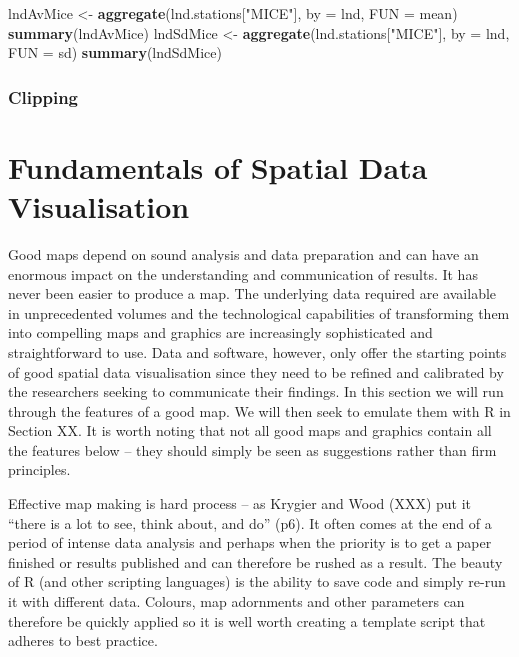 \documentclass[]{article}
\newenvironment{Shaded}{}{}
\newcommand{\KeywordTok}[1]{\textcolor[rgb]{0.00,0.44,0.13}{\textbf{{#1}}}}
\newcommand{\DataTypeTok}[1]{\textcolor[rgb]{0.56,0.13,0.00}{{#1}}}
\newcommand{\StringTok}[1]{\textcolor[rgb]{0.25,0.44,0.63}{{#1}}}
\newcommand{\NormalTok}[1]{{#1}}
\begin{document}
\begin{Shaded}
\begin{Highlighting}[]
\NormalTok{lndAvMice <- }\KeywordTok{aggregate}\NormalTok{(lnd.stations[}\StringTok{"MICE"}\NormalTok{], }\DataTypeTok{by =} \NormalTok{lnd, }\DataTypeTok{FUN =} \NormalTok{mean)}
\KeywordTok{summary}\NormalTok{(lndAvMice)}
\NormalTok{lndSdMice <- }\KeywordTok{aggregate}\NormalTok{(lnd.stations[}\StringTok{"MICE"}\NormalTok{], }\DataTypeTok{by =} \NormalTok{lnd, }\DataTypeTok{FUN =} \NormalTok{sd)}
\KeywordTok{summary}\NormalTok{(lndSdMice)}
\end{Highlighting}
\end{Shaded}
\subsubsection{Clipping}

\section{Fundamentals of Spatial Data Visualisation}

Good maps depend on sound analysis and data preparation and can have an
enormous impact on the understanding and communication of results. It
has never been easier to produce a map. The underlying data required are
available in unprecedented volumes and the technological capabilities of
transforming them into compelling maps and graphics are increasingly
sophisticated and straightforward to use. Data and software, however,
only offer the starting points of good spatial data visualisation since
they need to be refined and calibrated by the researchers seeking to
communicate their findings. In this section we will run through the
features of a good map. We will then seek to emulate them with R in
Section XX. It is worth noting that not all good maps and graphics
contain all the features below -- they should simply be seen as
suggestions rather than firm principles.

Effective map making is hard process -- as Krygier and Wood (XXX) put it
``there is a lot to see, think about, and do'' (p6). It often comes at
the end of a period of intense data analysis and perhaps when the
priority is to get a paper finished or results published and can
therefore be rushed as a result. The beauty of R (and other scripting
languages) is the ability to save code and simply re-run it with
different data. Colours, map adornments and other parameters can
therefore be quickly applied so it is well worth creating a template
script that adheres to best practice.
\end{document}
